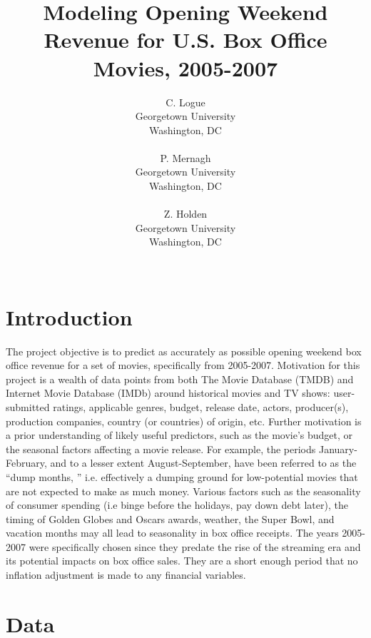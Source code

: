 \documentclass[10pt]{article}
\title{Modeling Opening Weekend Revenue for U.S. Box Office Movies, 2005-2007}
\author{
  C. Logue \\
  Georgetown University \\
  Washington, DC \\
\\\And
  P. Mernagh \\
  Georgetown University \\
  Washington, DC \\
\\\And
  Z. Holden \\
  Georgetown University \\
  Washington, DC \\
\\}
\begin{document}
\maketitle

\section{Introduction}
The project objective is to predict as accurately as possible opening weekend box office revenue for a set of movies, specifically from 2005-2007. Motivation for this project is a wealth of data points from both The Movie Database (TMDB) and Internet Movie Database (IMDb) around historical movies and TV shows: user-submitted ratings, applicable genres, budget, release date, actors, producer(s), production companies, country (or countries) of origin, etc. Further motivation is a prior understanding of likely useful predictors, such as the movie's budget, or the seasonal factors affecting a movie release. For example, the periods January-February, and to a lesser extent August-September, have been referred to as the ``dump months, '' i.e. effectively a dumping ground for low-potential movies that are not expected to make as much money. Various factors such as the seasonality of consumer spending (i.e binge before the holidays, pay down debt later), the timing of Golden Globes and Oscars awards, weather, the Super Bowl, and vacation months may all lead to seasonality in box office receipts.  The years 2005-2007 were specifically chosen since they predate the rise of the streaming era and its potential impacts on box office sales. They are a short enough period that no inflation adjustment is made to any financial variables. 
\section{Data}
\end{document}
